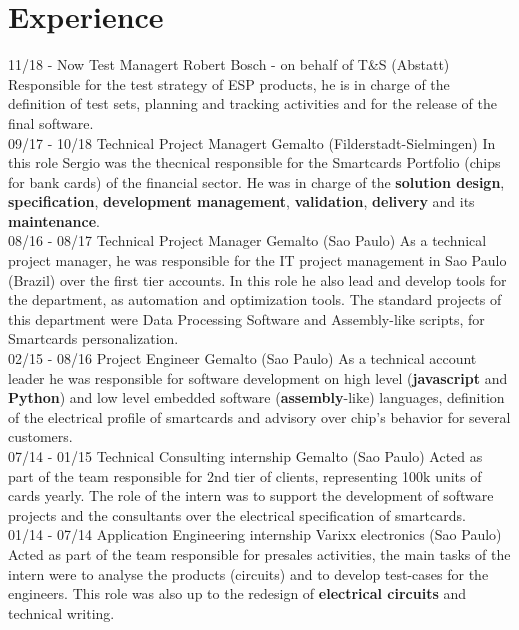 \documentclass[]{friggeri-cv}
\begin{document}
\section{Experience}
\begin{entrylist}
  \entry
    {11/18 - Now}
    {Test Managert}
    {\normalsize{Robert Bosch - on behalf of T\&S (Abstatt)}}
    {Responsible for the test strategy of ESP products, he is in charge of the definition of test sets, planning and tracking activities and for the release of the final software.
    \\}
  \entry
    {09/17 - 10/18}
    {Technical Project Managert}
    {\normalsize{Gemalto (Filderstadt-Sielmingen)}}
    {In this role Sergio was the thecnical responsible for the Smartcards Portfolio (chips for bank cards) of the  financial sector. He was in charge of the \textbf{solution design},\textbf{ specification},\textbf{ development management},\textbf{ validation},\textbf{ delivery} and its\textbf{ maintenance}.
     \\}
  \entry
    {08/16 - 08/17}
    {Technical Project Manager}
    {\normalsize{Gemalto (Sao Paulo)}}
    {As a technical project manager, he was responsible for the IT project management in Sao Paulo (Brazil) over the first tier accounts. In this role he also lead and develop tools for the department, as automation and optimization tools. The standard projects of this department were Data Processing Software and Assembly-like scripts, for Smartcards personalization. 
    \\}
    \entry
    {02/15 - 08/16}
    {Project Engineer}
    {\normalsize{Gemalto (Sao Paulo)}}
    {As a technical account leader he was responsible for software development on high level (\textbf{javascript} and \textbf{Python}) and low level embedded software (\textbf{assembly}-like) languages, definition of the electrical profile of smartcards and advisory over chip's behavior for several customers. \\}
    \entry
    {07/14 - 01/15}
    {Technical Consulting internship}
    {\normalsize{Gemalto (Sao Paulo)}}
    {Acted as part of the team responsible for 2nd tier of clients, representing 100k units of cards yearly. The role of the intern was to support the development of software projects and the consultants over the electrical specification of smartcards. \\}
    \entry
    {01/14 - 07/14}
    {Application Engineering internship}
    {\normalsize{Varixx electronics (Sao Paulo)}}
    {Acted as part of the team responsible for presales activities, the main tasks of the intern were to analyse the products (circuits) and to develop test-cases for the engineers. This role was also up to the redesign of \textbf{electrical circuits} and technical writing.}
\end{entrylist}
\newpage%
\end{document}
